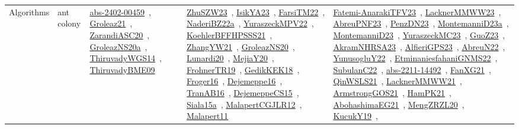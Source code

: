 {\begin{longtable}{lp{3cm}>{\raggedright\arraybackslash}p{6cm}>{\raggedright\arraybackslash}p{6cm}>{\raggedright\arraybackslash}p{8cm}}
Algorithms & ant colony & \href{../works/abs-2402-00459.pdf}{abs-2402-00459}~\cite{abs-2402-00459}, \href{../works/Groleaz21.pdf}{Groleaz21}~\cite{Groleaz21}, \href{../works/ZarandiASC20.pdf}{ZarandiASC20}~\cite{ZarandiASC20}, \href{../works/GroleazNS20a.pdf}{GroleazNS20a}~\cite{GroleazNS20a}, \href{../works/ThiruvadyWGS14.pdf}{ThiruvadyWGS14}~\cite{ThiruvadyWGS14}, \href{../works/ThiruvadyBME09.pdf}{ThiruvadyBME09}~\cite{ThiruvadyBME09} & \href{../works/ZhuSZW23.pdf}{ZhuSZW23}~\cite{ZhuSZW23}, \href{../works/IsikYA23.pdf}{IsikYA23}~\cite{IsikYA23}, \href{../works/FarsiTM22.pdf}{FarsiTM22}~\cite{FarsiTM22}, \href{../works/NaderiBZ22a.pdf}{NaderiBZ22a}~\cite{NaderiBZ22a}, \href{../works/YuraszeckMPV22.pdf}{YuraszeckMPV22}~\cite{YuraszeckMPV22}, \href{../works/KoehlerBFFHPSSS21.pdf}{KoehlerBFFHPSSS21}~\cite{KoehlerBFFHPSSS21}, \href{../works/ZhangYW21.pdf}{ZhangYW21}~\cite{ZhangYW21}, \href{../works/GroleazNS20.pdf}{GroleazNS20}~\cite{GroleazNS20}, \href{../works/Lunardi20.pdf}{Lunardi20}~\cite{Lunardi20}, \href{../works/MejiaY20.pdf}{MejiaY20}~\cite{MejiaY20}, \href{../works/FrohnerTR19.pdf}{FrohnerTR19}~\cite{FrohnerTR19}, \href{../works/GedikKEK18.pdf}{GedikKEK18}~\cite{GedikKEK18}, \href{../works/Froger16.pdf}{Froger16}~\cite{Froger16}, \href{../works/Dejemeppe16.pdf}{Dejemeppe16}~\cite{Dejemeppe16}, \href{../works/TranAB16.pdf}{TranAB16}~\cite{TranAB16}, \href{../works/DejemeppeCS15.pdf}{DejemeppeCS15}~\cite{DejemeppeCS15}, \href{../works/Siala15a.pdf}{Siala15a}~\cite{Siala15a}, \href{../works/MalapertCGJLR12.pdf}{MalapertCGJLR12}~\cite{MalapertCGJLR12}, \href{../works/Malapert11.pdf}{Malapert11}~\cite{Malapert11} & \href{../works/Fatemi-AnarakiTFV23.pdf}{Fatemi-AnarakiTFV23}~\cite{Fatemi-AnarakiTFV23}, \href{../works/LacknerMMWW23.pdf}{LacknerMMWW23}~\cite{LacknerMMWW23}, \href{../works/AbreuPNF23.pdf}{AbreuPNF23}~\cite{AbreuPNF23}, \href{../works/PenzDN23.pdf}{PenzDN23}~\cite{PenzDN23}, \href{../works/MontemanniD23a.pdf}{MontemanniD23a}~\cite{MontemanniD23a}, \href{../works/MontemanniD23.pdf}{MontemanniD23}~\cite{MontemanniD23}, \href{../works/YuraszeckMC23.pdf}{YuraszeckMC23}~\cite{YuraszeckMC23}, \href{../works/GuoZ23.pdf}{GuoZ23}~\cite{GuoZ23}, \href{../works/AkramNHRSA23.pdf}{AkramNHRSA23}~\cite{AkramNHRSA23}, \href{../works/AlfieriGPS23.pdf}{AlfieriGPS23}~\cite{AlfieriGPS23}, \href{../works/AbreuN22.pdf}{AbreuN22}~\cite{AbreuN22}, \href{../works/YunusogluY22.pdf}{YunusogluY22}~\cite{YunusogluY22}, \href{../works/EtminaniesfahaniGNMS22.pdf}{EtminaniesfahaniGNMS22}~\cite{EtminaniesfahaniGNMS22}, \href{../works/SubulanC22.pdf}{SubulanC22}~\cite{SubulanC22}, \href{../works/abs-2211-14492.pdf}{abs-2211-14492}~\cite{abs-2211-14492}, \href{../works/FanXG21.pdf}{FanXG21}~\cite{FanXG21}, \href{../works/QinWSLS21.pdf}{QinWSLS21}~\cite{QinWSLS21}, \href{../works/LacknerMMWW21.pdf}{LacknerMMWW21}~\cite{LacknerMMWW21}, \href{../works/ArmstrongGOS21.pdf}{ArmstrongGOS21}~\cite{ArmstrongGOS21}, \href{../works/HamPK21.pdf}{HamPK21}~\cite{HamPK21}, \href{../works/AbohashimaEG21.pdf}{AbohashimaEG21}~\cite{AbohashimaEG21}, \href{../works/MengZRZL20.pdf}{MengZRZL20}~\cite{MengZRZL20}, \href{../works/KucukY19.pdf}{KucukY19}~\cite{KucukY19}, 
\end{longtable}}
